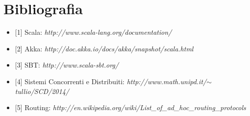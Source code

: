 \documentclass{article}
\newcommand{\Versione}{1.0}
\begin{document}
\pagestyle{fancy}

\chead{}
\rhead{
	\color{black}
	\bfseries \textsf{\normalsize v.\Versione\\} 
}
\section{Bibliografia}
\begin{itemize}
\item {[1]} Scala: \textit{http://www.scala-lang.org/documentation/}
\item {[2]} Akka: \textit{http://doc.akka.io/docs/akka/snapshot/scala.html}
\item {[3]} SBT: \textit{http://www.scala-sbt.org/}
\item {[4]} Sistemi Concorrenti e Distribuiti: \textit{http://www.math.unipd.it/$\sim$tullio/SCD/2014/}
\item {[5]} Routing: \textit{http://en.wikipedia.org/wiki/List\_of\_ad\_hoc\_routing\_protocols}
\end{itemize}
\begin{midpage}
\begin{center}
\null
\end{center}
\end{midpage}
\end{document}
